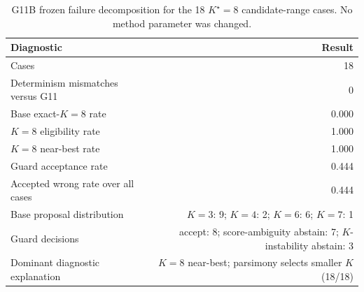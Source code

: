 \begin{table}[t]
\centering
\caption{G11B frozen failure decomposition for the 18 $K^\star=8$ candidate-range cases. No method parameter was changed.}
\label{tab:g11b_failure}
\scriptsize
\begin{tabular}{lr}
\toprule
Diagnostic & Result\\
\midrule
Cases & 18\\
Determinism mismatches versus G11 & 0\\
Base exact-$K=8$ rate & 0.000\\
$K=8$ eligibility rate & 1.000\\
$K=8$ near-best rate & 1.000\\
Guard acceptance rate & 0.444\\
Accepted wrong rate over all cases & 0.444\\
Base proposal distribution & $K=3$: 9; $K=4$: 2; $K=6$: 6; $K=7$: 1\\
Guard decisions & accept: 8; score-ambiguity abstain: 7; $K$-instability abstain: 3\\
Dominant diagnostic explanation & $K=8$ near-best; parsimony selects smaller $K$ (18/18)\\
\bottomrule
\end{tabular}
\end{table}
